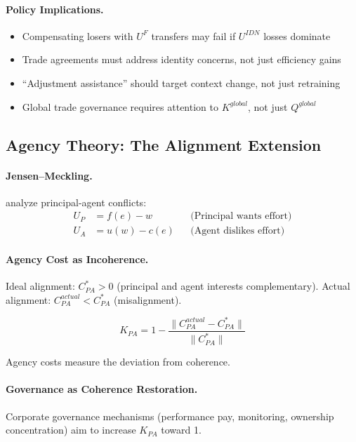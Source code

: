 \paragraph{Policy Implications.}
\begin{itemize}
  \item Compensating losers with $U^F$ transfers may fail if $U^{IDN}$ losses dominate
  \item Trade agreements must address identity concerns, not just efficiency gains
  \item ``Adjustment assistance'' should target context change, not just retraining
  \item Global trade governance requires attention to $K^{global}$, not just $Q^{global}$
\end{itemize}

\subsection{Agency Theory: The Alignment Extension}

\paragraph{Jensen--Meckling.}
\citet{jensenmeckling1976} analyze principal-agent conflicts:
\begin{align}
  U_P &= f(e) - w && \text{(Principal wants effort)} \\
  U_A &= u(w) - c(e) && \text{(Agent dislikes effort)}
\end{align}

\paragraph{Agency Cost as Incoherence.}
Ideal alignment: $C_{PA}^* > 0$ (principal and agent interests complementary).
Actual alignment: $C_{PA}^{actual} < C_{PA}^*$ (misalignment).

\begin{equation}
  K_{PA} = 1 - \frac{\|C_{PA}^{actual} - C_{PA}^*\|}{\|C_{PA}^*\|}
\end{equation}

Agency costs measure the deviation from coherence.

\paragraph{Governance as Coherence Restoration.}
Corporate governance mechanisms (performance pay, monitoring, ownership concentration)
aim to increase $K_{PA}$ toward 1.

